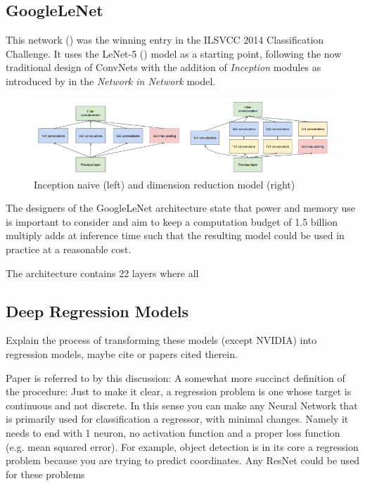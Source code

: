 \subsection{GoogleLeNet}

This network (\cite{szegedy2014going}) was the winning entry in the ILSVCC 2014 Classification Challenge. It uses the LeNet-5 (\cite{Lecun98gradient-basedlearning}) model as a starting point, following the now traditional design of ConvNets with the addition of \textit{Inception} modules as introduced by \cite{lin2013network} in the \textit{Network in Network} model.

\begin{figure}[ht]
 \centering 
 \includegraphics[width=\columnwidth]{Figures/InceptionModules.png}
 \caption{Inception naive (left) and dimension reduction model (right)}
 \label{fig:inception_modules}
\end{figure}

The designers of the GoogleLeNet architecture state that power and memory use is important to consider and aim to keep a computation budget of 1.5 billion multiply adds at inference time such that the resulting model could be used in practice at a reasonable cost.

The architecture contains 22 layers where all

\subsection{Deep Regression Models}
Explain the process of transforming these models (except NVIDIA) into regression models, maybe cite \cite{lathuilire2018comprehensive} or papers cited therein.

Paper is referred to by this discussion: 
A somewhat more succinct definition of the procedure:  
Just to make it clear, a regression problem is one whose target is continuous and not discrete. In this sense you can make any Neural Network that is primarily used for classification a regressor, with minimal changes. Namely it needs to end with 1 neuron, no activation function and a proper loss function (e.g. mean squared error). For example, object detection is in its core a regression problem because you are trying to predict coordinates. Any ResNet could be used for these problems

